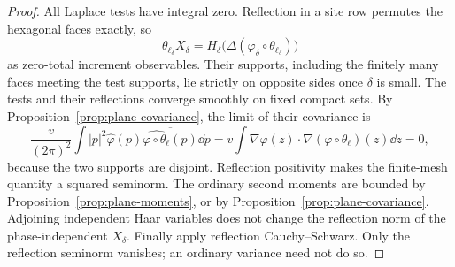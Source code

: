 \begin{proof}
All Laplace tests have integral zero.  Reflection in a site row
permutes the hexagonal faces exactly, so
\[
 \theta_{\ell_\delta}X_\delta
   =H_\delta\bigl(\Delta(\varphi_\delta\circ\theta_{\ell_\delta})\bigr)
\]
as zero-total increment observables.  Their supports, including the
finitely many faces meeting the test supports, lie strictly on
opposite sides once $\delta$ is small.  The tests and their reflections
converge smoothly on fixed compact sets.  By
Proposition~\ref{prop:plane-covariance}, the limit of their covariance is
\[
 \frac{v}{(2\pi)^2}\int |p|^2\widehat\varphi(p)
             \overline{\widehat{\varphi\circ\theta_\ell}(p)}\dd p
    =v\int\nabla\varphi(z)\cdot
                   \nabla(\varphi\circ\theta_\ell)(z)\dd z=0,
\]
because the two supports are disjoint.  Reflection positivity makes
the finite-mesh quantity a squared seminorm.  The ordinary second
moments are bounded by Proposition~\ref{prop:plane-moments}, or by
Proposition~\ref{prop:plane-covariance}.  Adjoining independent Haar
variables does not change the reflection norm of the phase-independent
$X_\delta$.  Finally apply reflection Cauchy--Schwarz.  Only the
reflection seminorm vanishes; an ordinary variance need not do so.
\end{proof}
